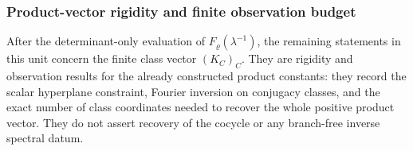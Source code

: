 \documentclass[11pt,a4paper]{amsart}
\theoremstyle{plain}
\theoremstyle{definition}
\theoremstyle{remark}
\begin{document}
\subsubsection{Product-vector rigidity and finite observation budget}
\label{subsubsec:class-product-vector-rigidity}

After the determinant-only evaluation of \(F_\varrho(\lambda^{-1})\), the
remaining statements in this unit concern the finite class vector
\((K_C)_C\).  They are rigidity and observation results for the already
constructed product constants: they record the scalar hyperplane constraint,
Fourier inversion on conjugacy classes, and the exact number of class
coordinates needed to recover the whole positive product vector.  They do not
assert recovery of the cocycle or any branch-free inverse spectral datum.
\end{document}
